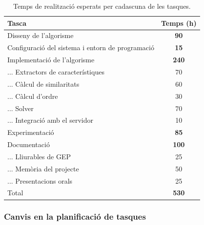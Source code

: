 \begin{table}[!htb]
\begin{center}
\begin{tabular}{|l||c|}
     \hline
     Tasca & Temps (h) \\
     \hline
     \hline
     Disseny de l'algorisme & \textbf{90}\\
     \hline 
     Configuració del sistema i entorn de programació & \textbf{15}\\
     \hline 
     Implementació de l'algorisme & \textbf{240}\\
     
     ... Extractors de característiques & 70 \\
     
     ... Càlcul de similaritats & 60 \\
     
     ... Càlcul d'ordre & 30 \\
     
     

     ... Solver & 70 \\
     
     ... Integració amb el servidor & 10 \\
     \hline 
     Experimentació & \textbf{85}\\
     \hline 
     Documentació & \textbf{100}\\
     
     ... Lliurables de GEP & 25\\
     
     ... Memòria del projecte & 50\\
     
     ... Presentacions orals & 25 \\
     \hline
     \hline 
     Total &  \textbf{530}\\
     \hline
\end{tabular}
\end{center}
    \caption{Temps de realització esperats per cadascuna de les tasques.}
    \label{tab:timetable}
\end{table}

\subsubsection{Canvis en la planificació de tasques}

